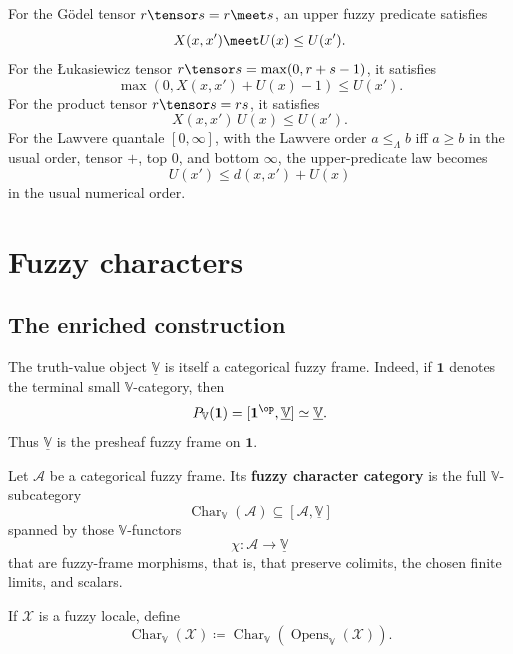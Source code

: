 \begin{example}
\label{ex:standard-upper-fuzzy-predicates}
For the G\"odel tensor \(r\tensor s=r\meet s\), an upper fuzzy predicate satisfies
\[
    X(x,x')\meet U(x)\leq U(x').
\]
For the {\L}ukasiewicz tensor \(r\tensor s=\max(0,r+s-1)\), it satisfies
\[
    \max(0,X(x,x')+U(x)-1)\leq U(x').
\]
For the product tensor \(r\tensor s=rs\), it satisfies
\[
    X(x,x')\,U(x)\leq U(x').
\]
For the Lawvere quantale \([0,\infty]\), with the Lawvere order
\(a\leq_\Lambda b\) iff \(a\geq b\) in the usual order, tensor \(+\), top \(0\),
and bottom \(\infty\), the upper-predicate law becomes
\[
    U(x')\leq d(x,x')+U(x)
\]
in the usual numerical order.
\end{example}

\section{Fuzzy characters}
\label{sec:fuzzy-characters}

\subsection{The enriched construction}
\label{subsec:fuzzy-characters-enriched}

The truth-value object \(\underline{\mathbb V}\) is itself a categorical fuzzy
frame.  Indeed, if \(\mathbf 1\) denotes the terminal small \(\mathbb V\)-category,
then
\[
    P_{\mathbb V}(\mathbf 1)
    =
    [\mathbf 1^{\op},\underline{\mathbb V}]
    \simeq
    \underline{\mathbb V}.
\]
Thus \(\underline{\mathbb V}\) is the presheaf fuzzy frame on \(\mathbf 1\).

\begin{definition}
\label{def:fuzzy-character-enriched}
Let \(\mathcal A\) be a categorical fuzzy frame.  Its \textbf{fuzzy character
category} is the full \(\mathbb V\)-subcategory
\[
    \operatorname{Char}_{\mathbb V}(\mathcal A)
    \subseteq
    [\mathcal A,\underline{\mathbb V}]
\]
spanned by those \(\mathbb V\)-functors
\[
    \chi:\mathcal A\to\underline{\mathbb V}
\]
that are fuzzy-frame morphisms, that is, that preserve colimits, the chosen finite
limits, and scalars.
\end{definition}

\begin{definition}
\label{def:fuzzy-characters-locale}
If \(\mathcal X\) is a fuzzy locale, define
\[
    \operatorname{Char}_{\mathbb V}(\mathcal X)
    \coloneqq
    \operatorname{Char}_{\mathbb V}
    (\operatorname{Opens}_{\mathbb V}(\mathcal X)).
\]
\end{definition}

